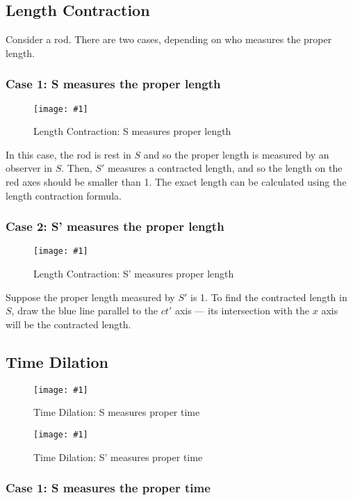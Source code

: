 \documentclass[a4paper,12pt]{article}
\newcommand{\img}[4]{\begin{center}
  \begin{figure}[H]
    \centering
    \texttt{[image: \#1]}
    \caption{#3}
    \label{fig:#4}
  \end{figure}
\end{center}}
\begin{document}
\pagebreak


\subsection{Length Contraction}

Consider a rod. There are two cases, depending on who measures the proper length.

\subsubsection*{Case 1: S measures the proper length}

\img{rod1.png}{0.7}{Length Contraction: S measures proper length}{rod1}

In this case, the rod is rest in $S$ and so the proper length is measured by an observer in $S$. Then, $S'$ measures a contracted length, and so the length on the red axes should be smaller than 1. The exact length can be calculated using the length contraction formula.

\pagebreak

\subsubsection*{Case 2: S' measures the proper length}

\img{rod2.png}{0.7}{Length Contraction: S' measures proper length}{rod1}

Suppose the proper length measured by $S'$ is 1. To find the contracted length in $S$, draw the \textcolor{blue!60!black!80}{blue line} parallel to the $ct'$ axis --- its intersection with the $x$ axis will be the contracted length.

\pagebreak

\subsection{Time Dilation}

\begin{minipage}{0.475\textwidth}
  \img{clock1.png}{1}{Time Dilation: S measures proper time}{clock1}
\end{minipage}\hspace*{0.05\textwidth}%
\begin{minipage}{0.475\textwidth}
  \img{clock2.png}{1}{Time Dilation: S' measures proper time}{clock2}
\end{minipage}

\subsubsection*{Case 1: S measures the proper time}
\end{document}
